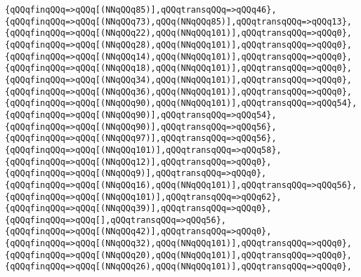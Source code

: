 \verb|{qQQqfinqQQq=>qQQq[(NNqQQq85)],qQQqtransqQQq=>qQQq46},|\newline
\verb|{qQQqfinqQQq=>qQQq[(NNqQQq73),qQQq(NNqQQq85)],qQQqtransqQQq=>qQQq13},|\newline
\verb|{qQQqfinqQQq=>qQQq[(NNqQQq22),qQQq(NNqQQq101)],qQQqtransqQQq=>qQQq0},|\newline
\verb|{qQQqfinqQQq=>qQQq[(NNqQQq28),qQQq(NNqQQq101)],qQQqtransqQQq=>qQQq0},|\newline
\verb|{qQQqfinqQQq=>qQQq[(NNqQQq14),qQQq(NNqQQq101)],qQQqtransqQQq=>qQQq0},|\newline
\verb|{qQQqfinqQQq=>qQQq[(NNqQQq18),qQQq(NNqQQq101)],qQQqtransqQQq=>qQQq0},|\newline
\verb|{qQQqfinqQQq=>qQQq[(NNqQQq34),qQQq(NNqQQq101)],qQQqtransqQQq=>qQQq0},|\newline
\verb|{qQQqfinqQQq=>qQQq[(NNqQQq36),qQQq(NNqQQq101)],qQQqtransqQQq=>qQQq0},|\newline
\verb|{qQQqfinqQQq=>qQQq[(NNqQQq90),qQQq(NNqQQq101)],qQQqtransqQQq=>qQQq54},|\newline
\verb|{qQQqfinqQQq=>qQQq[(NNqQQq90)],qQQqtransqQQq=>qQQq54},|\newline
\verb|{qQQqfinqQQq=>qQQq[(NNqQQq90)],qQQqtransqQQq=>qQQq56},|\newline
\verb|{qQQqfinqQQq=>qQQq[(NNqQQq97)],qQQqtransqQQq=>qQQq56},|\newline
\verb|{qQQqfinqQQq=>qQQq[(NNqQQq101)],qQQqtransqQQq=>qQQq58},|\newline
\verb|{qQQqfinqQQq=>qQQq[(NNqQQq12)],qQQqtransqQQq=>qQQq0},|\newline
\verb|{qQQqfinqQQq=>qQQq[(NNqQQq9)],qQQqtransqQQq=>qQQq0},|\newline
\verb|{qQQqfinqQQq=>qQQq[(NNqQQq16),qQQq(NNqQQq101)],qQQqtransqQQq=>qQQq56},|\newline
\verb|{qQQqfinqQQq=>qQQq[(NNqQQq101)],qQQqtransqQQq=>qQQq62},|\newline
\verb|{qQQqfinqQQq=>qQQq[(NNqQQq39)],qQQqtransqQQq=>qQQq0},|\newline
\verb|{qQQqfinqQQq=>qQQq[],qQQqtransqQQq=>qQQq56},|\newline
\verb|{qQQqfinqQQq=>qQQq[(NNqQQq42)],qQQqtransqQQq=>qQQq0},|\newline
\verb|{qQQqfinqQQq=>qQQq[(NNqQQq32),qQQq(NNqQQq101)],qQQqtransqQQq=>qQQq0},|\newline
\verb|{qQQqfinqQQq=>qQQq[(NNqQQq20),qQQq(NNqQQq101)],qQQqtransqQQq=>qQQq0},|\newline
\verb|{qQQqfinqQQq=>qQQq[(NNqQQq26),qQQq(NNqQQq101)],qQQqtransqQQq=>qQQq0},|\newline
